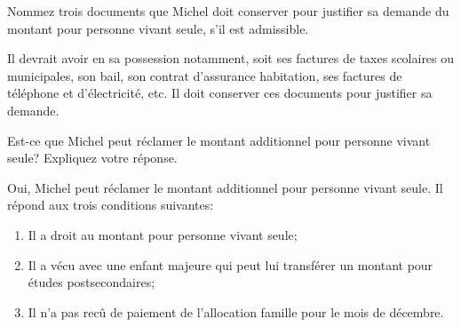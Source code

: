 \begin{sousQuestion}
	Nommez trois documents que Michel doit conserver pour justifier sa demande du montant pour personne vivant seule, s'il est admissible.
\end{sousQuestion}
Il devrait avoir en sa possession notamment, soit ses factures de taxes scolaires ou municipales, son bail, son contrat d'assurance habitation, ses factures de téléphone et d'électricité, etc. Il doit conserver ces documents pour justifier sa demande.

\begin{sousQuestion}
	Est-ce que Michel peut réclamer le montant additionnel pour personne vivant seule? Expliquez votre réponse.
\end{sousQuestion}
Oui, Michel peut réclamer le montant additionnel pour personne vivant seule. Il répond aux trois conditions suivantes:
\begin{enumerate}
	\item Il a droit au montant pour personne vivant seule;
	\item Il a vécu avec une enfant majeure qui peut lui transférer un montant pour études postsecondaires;
	\item Il n'a pas recû de paiement de l'allocation famille pour le mois de décembre.
\end{enumerate}

